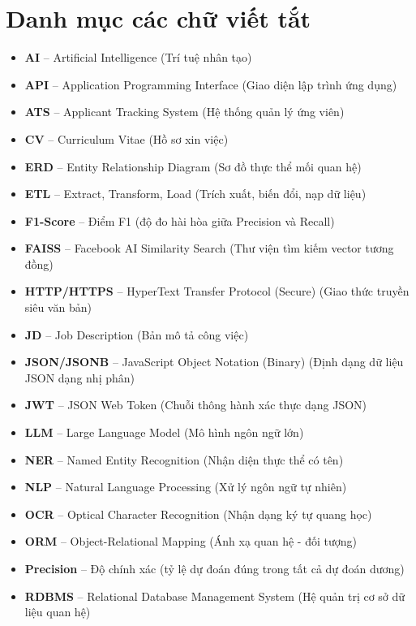 \chapter*{Danh mục các chữ viết tắt}
\label{abbreviations}

\begin{itemize}
    \item \textbf{AI} -- Artificial Intelligence (Trí tuệ nhân tạo)
    \item \textbf{API} -- Application Programming Interface (Giao diện lập trình ứng dụng)
    \item \textbf{ATS} -- Applicant Tracking System (Hệ thống quản lý ứng viên)
    \item \textbf{CV} -- Curriculum Vitae (Hồ sơ xin việc)
    \item \textbf{ERD} -- Entity Relationship Diagram (Sơ đồ thực thể mối quan hệ)
    \item \textbf{ETL} -- Extract, Transform, Load (Trích xuất, biến đổi, nạp dữ liệu)
    \item \textbf{F1-Score} -- Điểm F1 (độ đo hài hòa giữa Precision và Recall)
    \item \textbf{FAISS} -- Facebook AI Similarity Search (Thư viện tìm kiếm vector tương đồng)
    \item \textbf{HTTP/HTTPS} -- HyperText Transfer Protocol (Secure) (Giao thức truyền siêu văn bản)
    \item \textbf{JD} -- Job Description (Bản mô tả công việc)
    \item \textbf{JSON/JSONB} -- JavaScript Object Notation (Binary) (Định dạng dữ liệu JSON dạng nhị phân)
    \item \textbf{JWT} -- JSON Web Token (Chuỗi thông hành xác thực dạng JSON)
    \item \textbf{LLM} -- Large Language Model (Mô hình ngôn ngữ lớn)
    \item \textbf{NER} -- Named Entity Recognition (Nhận diện thực thể có tên)
    \item \textbf{NLP} -- Natural Language Processing (Xử lý ngôn ngữ tự nhiên)
    \item \textbf{OCR} -- Optical Character Recognition (Nhận dạng ký tự quang học)
    \item \textbf{ORM} -- Object-Relational Mapping (Ánh xạ quan hệ - đối tượng)
    \item \textbf{Precision} -- Độ chính xác (tỷ lệ dự đoán đúng trong tất cả dự đoán dương)
    \item \textbf{RDBMS} -- Relational Database Management System (Hệ quản trị cơ sở dữ liệu quan hệ)

\end{itemize}
